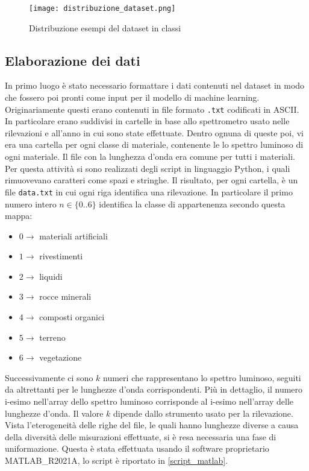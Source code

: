 \begin{figure}
    \centering
    \texttt{[image: distribuzione\_dataset.png]}
    \caption{Distribuzione esempi del dataset in classi}
    \label{distr_esempi}
\end{figure}

\subsection{Elaborazione dei dati}
In primo luogo è stato necessario formattare i dati contenuti nel dataset in modo che fossero poi pronti come input per il modello di machine learning. Originariamente questi erano contenuti in file formato \verb|.txt| codificati in ASCII. In particolare erano suddivisi in cartelle in base allo spettrometro usato nelle rilevazioni e all'anno in cui sono state effettuate. Dentro ognuna di queste poi, vi era una cartella per ogni classe di materiale, contenente le lo spettro luminoso di ogni materiale. Il file con la lunghezza d'onda era comune per tutti i materiali. Per questa attività si sono realizzati degli script in linguaggio Python, i quali rimuovevano caratteri come spazi e stringhe. Il risultato, per ogni cartella, è un file \verb|data.txt| in cui ogni riga identifica una rilevazione. In particolare il primo numero intero $n \in \{ 0 .. 6 \}$ identifica la classe di appartenenza secondo questa mappa:
\begin{itemize}
    \item $0 \rightarrow$ materiali artificiali
    \item $1 \rightarrow$ rivestimenti
    \item $2 \rightarrow$ liquidi
    \item $3 \rightarrow$ rocce minerali
    \item $4 \rightarrow$ composti organici
    \item $5 \rightarrow$ terreno
    \item $6 \rightarrow$ vegetazione
\end{itemize}
Successivamente ci sono $k$ numeri che rappresentano lo spettro luminoso, seguiti da altrettanti per le lunghezze d'onda corrispondenti. Più in dettaglio, il numero i-esimo nell'array dello spettro luminoso corrisponde al i-esimo nell'array delle lunghezze d'onda. Il valore $k$ dipende dallo strumento usato per la rilevazione.\\
Vista l'eterogeneità delle righe del file, le quali hanno lunghezze diverse a causa della diversità delle misurazioni effettuate, si è resa necessaria una fase di uniformazione. Questa è stata effettuata usando il software proprietario MATLAB\_R2021A, lo script è riportato in \ref{script_matlab}.

